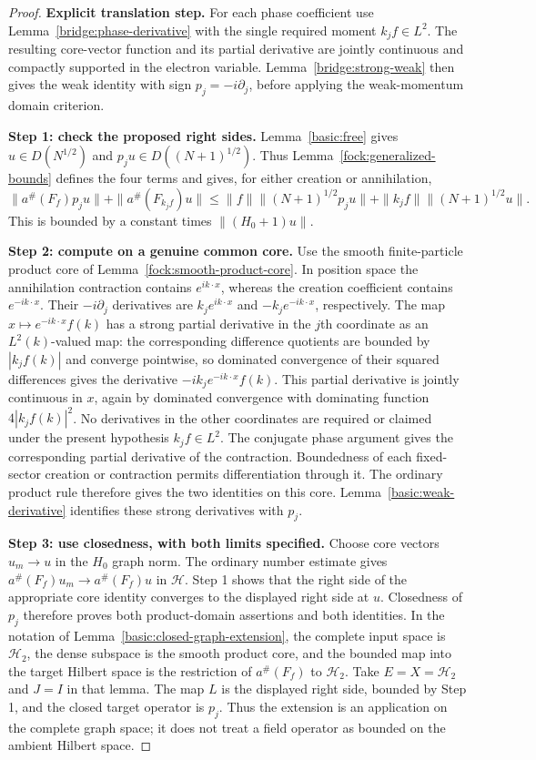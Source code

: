 \documentclass[11pt,a4paper]{article}
\theoremstyle{definition}
\theoremstyle{remark}
\begin{document}
\begin{proof}
\noindent\textbf{Explicit translation step.} For each phase coefficient use Lemma~\ref{bridge:phase-derivative} with
the single required moment $k_jf\in L^2$. The resulting core-vector
function and its partial derivative are jointly continuous and compactly
supported in the electron variable. Lemma~\ref{bridge:strong-weak} then
gives the weak identity with sign $p_j=-i\partial_j$, before applying
the weak-momentum domain criterion.

\textbf{Step 1: check the proposed right sides.}
Lemma~\ref{basic:free} gives $u\in D(N^{1/2})$ and
$p_ju\in D((N+1)^{1/2})$. Thus
Lemma~\ref{fock:generalized-bounds} defines the four terms and gives,
for either creation or annihilation,
\[
 \|a^\#(F_f)p_ju\|+\|a^\#(F_{k_jf})u\|
 \leq \|f\|\|(N+1)^{1/2}p_ju\|
        +\|k_jf\|\|(N+1)^{1/2}u\|.
\]
This is bounded by a constant times $\|(H_0+1)u\|$.

\textbf{Step 2: compute on a genuine common core.}
Use the smooth finite-particle product core of
Lemma~\ref{fock:smooth-product-core}. In position space the annihilation
contraction contains $e^{ik\cdot x}$, whereas the creation coefficient
contains $e^{-ik\cdot x}$. Their $-i\partial_j$ derivatives are
$k_je^{ik\cdot x}$ and $-k_je^{-ik\cdot x}$, respectively. The map
$x\mapsto e^{-ik\cdot x}f(k)$ has a strong partial derivative in
the $j$th coordinate as an $L^2(k)$-valued map: the corresponding
difference quotients are bounded by $|k_jf(k)|$ and converge
pointwise, so dominated convergence of their squared differences
gives the derivative $-ik_je^{-ik\cdot x}f(k)$. This partial
derivative is jointly continuous in $x$, again by dominated
convergence with dominating function $4|k_jf(k)|^2$.
No derivatives in the other coordinates are required or claimed
under the present hypothesis $k_jf\in L^2$. The conjugate phase
argument gives the corresponding partial derivative of the
contraction. Boundedness
of each fixed-sector creation or contraction permits differentiation
through it. The ordinary product rule therefore gives the two
identities on this core. Lemma~\ref{basic:weak-derivative} identifies
these strong derivatives with $p_j$.

\textbf{Step 3: use closedness, with both limits specified.}
Choose core vectors $u_m\to u$ in the $H_0$ graph norm. The ordinary
number estimate gives $a^\#(F_f)u_m\to a^\#(F_f)u$ in $\mathcal H$.
Step 1 shows that the right side of the appropriate core identity
converges to the displayed right side at $u$. Closedness of $p_j$
therefore proves both product-domain assertions and both identities.
In the notation of Lemma~\ref{basic:closed-graph-extension}, the
complete input space is $\mathcal H_2$, the dense subspace is the
smooth product core, and the bounded map into the target Hilbert
space is the restriction of $a^\#(F_f)$ to $\mathcal H_2$.
Take $E=X=\mathcal H_2$ and $J=I$ in that lemma.
The map $L$ is the displayed right side, bounded by Step 1, and
the closed target operator is $p_j$. Thus the extension is an
application on the complete graph space; it does not treat a field
operator as bounded on the ambient Hilbert space.
\end{proof}
\end{document}
